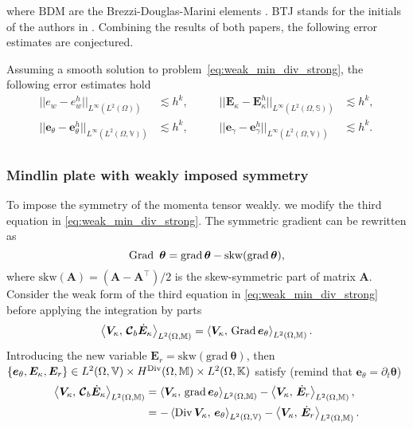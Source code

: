 where $\mathrm{BDM}$ are the Brezzi-Douglas-Marini elements \cite{brezzi1985bdm}. BTJ stands for the initials of the authors in \cite{becache2000wave,becache2001elas}. Combining the results of both papers, the following error estimates are conjectured.
\begin{conjecture}\label{conj:BJTestimates}
	Assuming a smooth solution to problem~\eqref{eq:weak_min_div_strong}, the following error estimates hold 
	\begin{equation}
	\label{eq:errBEC}
	\begin{aligned}
	||e_w - e_w^h||_{L^{\infty}(L^2(\Omega))} &\lesssim h^{k}, \\
	||\bm{e}_\theta - \bm{e}_\theta^h||_{L^{\infty}(L^2(\Omega, \mathbb{V}))} &\lesssim h^{k}, \\
	\end{aligned} \qquad
	\begin{aligned}
	||\bm{E}_\kappa - \bm{E}_\kappa^h||_{L^{\infty}(L^2(\Omega, \mathbb{S}))} &\lesssim  h^{k}, \\
	||\bm{e}_\gamma - \bm{e}_\gamma^ h||_{L^{\infty}(L^2(\Omega, \mathbb{V}))} &\lesssim  h^{k}. \\
	\end{aligned} 
	\end{equation}
	
\end{conjecture}


\subsubsection{Mindlin plate with weakly imposed symmetry}\label{sec:min_weak}
To impose the symmetry of the momenta tensor weakly. we modify the third equation in \eqref{eq:weak_min_div_strong}. The symmetric gradient can be rewritten as 
\[
\Grad\ \bm{\theta} = \grad \bm{\theta} - \mathrm{skw}(\grad \bm{\theta}),
\]
where $\mathrm{skw}(\bm{A})=(\bm{A} - \bm{A}^\top)/2$ is the skew-symmetric part of matrix $\bm{A}$. Consider the weak form of the third equation in \eqref{eq:weak_min_div_strong} before applying the integration by parts
\[
\inner[L^2(\Omega, \mathbb{M})]{\bm{V}_\kappa}{\bm{\mathcal{C}}_b \dot{\bm{E}}_\kappa} = \inner[L^2(\Omega, \mathbb{M})]{\bm{V}_\kappa}{\Grad \bm{e}_\theta}. 
\] Introducing the new variable $\bm{E}_r = \mathrm{skw}(\mathrm{grad}\ \bm{\theta})$, then $\{\bm{e}_\theta, \bm{E}_\kappa, \bm{E}_r\} \in L^2(\Omega, \mathbb{V}) \times H^{\Div}(\Omega, \mathbb{M}) \times L^2(\Omega, \mathbb{K})$ satisfy (remind that $\bm{e}_\theta = \partial_t {\bm{\theta}}$)
\begin{equation*}
\begin{aligned}
\inner[L^2(\Omega, \mathbb{M})]{\bm{V}_\kappa}{\bm{\mathcal{C}}_b \dot{\bm{E}}_\kappa} &= \inner[L^2(\Omega, \mathbb{M})]{\bm{V}_\kappa}{\grad \bm{e}_\theta} - \inner[L^2(\Omega, \mathbb{M})]{\bm{V}_\kappa}{\dot{\bm{E}}_r}, \\
&= -\inner[L^2(\Omega, \mathbb{V})]{\Div\bm{V}_\kappa}{\bm{e}_\theta} - \inner[L^2(\Omega, \mathbb{M})]{\bm{V}_\kappa}{\dot{\bm{E}}_r}.
\end{aligned}
\end{equation*}


